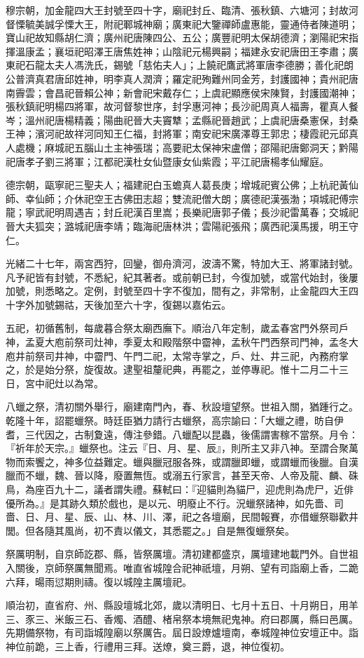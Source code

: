 \begin{pinyinscope}
穆宗朝，加金龍四大王封號至四十字，廟祀封丘、臨清、張秋鎮、六塘河；封故河督慄毓美誠孚慄大王，附祀鄆城神廟；廣東祀大鑒禪師盧惠能，靈通侍者陳道明；寶山祀故知縣胡仁濟；廣州祀唐陳四公、五公；廣豐祀明太保胡德濟；瀏陽祀宋指揮溫康孟；襄垣祀昭澤王唐焦姓神；山陰祀元楊興嗣；福建永安祀唐田王李肅；廣東祀石龍太夫人馮洗氏，錫號「慈佑夫人」；上饒祀鷹武將軍唐李德勝；善化祀朗公普濟真君唐邱姓神，明李真人潤濟；羅定祀殉難州同金芳，封護國神；貴州祀唐南霽雲；會昌祀晉賴公神；新會祀宋戴存仁；上虞祀顯應侯宋陳賢，封護國潮神；張秋鎮祀明楊四將軍，故河督黎世序，封孚惠河神；長沙祀周真人福壽，瞿真人餐岑；溫州祀唐楊精義；陽曲祀晉大夫竇犨；孟縣祀晉趙武；上虞祀唐桑憲保，封桑王神；濱河祀故祥河同知王仁福，封將軍；南安祀宋廣澤尊王郭忠；棲霞祀元邱真人處機；麻城祀五腦山土主神張瑞；高要祀太保神宋盧僧；邵陽祀唐鄭洞天；黔陽祀唐孝子劉三將軍；江都祀漢杜女仙暨康女仙紫霞；平江祀唐楊孝仙耀庭。

德宗朝，甌寧祀三聖夫人；福建祀白玉蟾真人葛長庚；增城祀賓公佛；上杭祀黃仙師、幸仙師；介休祀空王古佛田志超；雙流祀僧大朗；廣德祀漢張渤；項城祀傅宗龍；寧武祀明周遇吉；封丘祀漢百里嵩；長樂祀唐郭子儀；長沙祀雷萬春；交城祀晉大夫狐突；潞城祀唐李靖；臨海祀唐林洪；雲陽祀張飛；廣西祀漢馬援，明王守仁。

光緒二十七年，兩宮西狩，回鑾，御舟濟河，波濤不驚，特加大王、將軍諸封號。凡予祀皆有封號，不悉紀，紀其著者。或前朝已封，今復加號，或當代始封，後屢加號，則悉略之。定例，封號至四十字不復加，間有之，非常制，止金龍四大王四十字外加號錫祜，天後加至六十字，復錫以嘉佑云。

五祀，初循舊制，每歲暮合祭太廟西廡下。順治八年定制，歲孟春宮門外祭司戶神，孟夏大庖前祭司灶神，季夏太和殿階祭中霤神，孟秋午門西祭司門神，孟冬大庖井前祭司井神，中霤門、午門二祀，太常寺掌之，戶、灶、井三祀，內務府掌之，於是始分祭，旋復故。逮聖祖釐祀典，再罷之，並停專祀。惟十二月二十三日，宮中祀灶以為常。

八蠟之祭，清初關外舉行，廟建南門內，春、秋設壇望祭。世祖入關，猶踵行之。乾隆十年，詔罷蠟祭。時廷臣猶力請行古蠟祭，高宗諭曰：「大蠟之禮，昉自伊耆，三代因之，古制夐遠，傳注參錯。八蠟配以昆蟲，後儒謂害稼不當祭。月令：『祈年於天宗。』蠟祭也。注云『日、月、星、辰』，則所主又非八神。至謂合聚萬物而索饗之，神多位益難定。蠟與臘冠服各殊，或謂臘即蠟，或謂蠟而後臘。自漢臘而不蠟，魏、晉以降，廢置無恆。或溺五行家言，甚至天帝、人帝及龍、麟、硃鳥，為座百九十二，議者謂失禮。蘇軾曰：『迎貓則為貓尸，迎虎則為虎尸，近俳優所為。』是其跡久類於戲也，是以元、明廢止不行。況蠟祭諸神，如先嗇、司嗇、日、月、星、辰、山、林、川、澤，祀之各壇廟，民間報賽，亦借蠟祭聯歡井閭。但各隨其風尚，初不責以儀文，其悉罷之。」自是無復蠟祭矣。

祭厲明制，自京師訖郡、縣，皆祭厲壇。清初建都盛京，厲壇建地載門外。自世祖入關後，京師祭厲無聞焉。唯直省城隍合祀神祇壇，月朔、望有司詣廟上香，二跪六拜，暘雨愆期則禱。復以城隍主厲壇祀。

順治初，直省府、州、縣設壇城北郊，歲以清明日、七月十五日、十月朔日，用羊三、豕三、米飯三石、香燭、酒醴、楮帛祭本境無祀鬼神。府曰郡厲，縣曰邑厲。先期備祭物，有司詣城隍廟以祭厲告。屆日設燎爐壇南，奉城隍神位安壇正中。詣神位前跪，三上香，行禮用三拜。送燎，奠三爵，退，神位復初。


\end{pinyinscope}